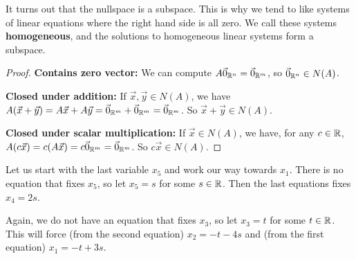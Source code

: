 It turns out that the nullspace is a subspace. This is why we tend to like systems of linear equations where the right hand side is all zero.
We call these systems \textbf{homogeneous}, and the solutions to homogeneous linear systems form a subspace.
\begin{proof}
	\textbf{Contains zero vector:} We can compute $A\vec{0}_{\mathbb{R}^n}=\vec{0}_{\mathbb{R}^m}$, so $\vec{0}_{\mathbb{R}^n}\in N(A)$.

	\textbf{Closed under addition:} If $\vec{x},\vec{y}\in N(A)$, we have $A(\vec{x}+\vec{y})=A\vec{x}+A\vec{y}=\vec{0}_{\mathbb{R}^m}+\vec{0}_{\mathbb{R}^m}=\vec{0}_{\mathbb{R}^m}$. So $\vec{x}+\vec{y}\in N(A)$.

	\textbf{Closed under scalar multiplication:} If $\vec{x}\in N(A)$, we have, for any $c\in\mathbb{R}$, $A(c\vec{x})=c(A\vec{x})=c\vec{0}_{\mathbb{R}^m}=\vec{0}_{\mathbb{R}^m}$. So $c\vec{x}\in N(A)$.
\end{proof}
Let us start with the last variable $x_5$ and work our way towards $x_1$.
There is no equation that fixes $x_5$, so let $x_5 = s$ for some $s\in\mathbb{R}$.
Then the last equations fixes $x_4 = 2s$. 

Again, we do not have an equation that fixes $x_3$, so let $x_3=t$ for some $t\in\mathbb{R}$.
This will force (from the second equation) $x_2= -t-4s$ and (from the first equation) $x_1 = -t+3s$.

